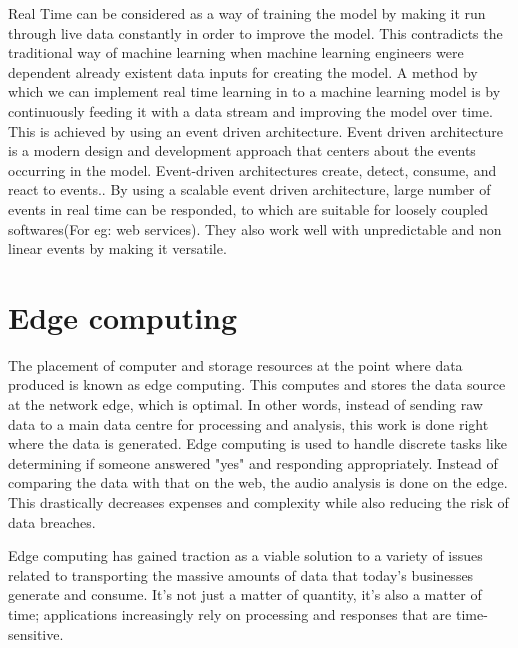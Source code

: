Real Time can be considered as a way of training the model by making it run through live data constantly in order to improve the model. This contradicts the traditional way of machine learning when machine learning engineers were dependent already existent data inputs for creating the model. 
A method by which we can implement real time learning in to a machine learning model is by continuously feeding it with a data stream and improving the model over time. This is achieved by using an event driven architecture. Event driven architecture is a modern design and development approach that centers about the events occurring in the model. Event-driven architectures create, detect, consume, and react to events.\cite{Hazelcast:2022}. By using a scalable event driven architecture, large number of events in real time can be responded, to which are suitable for loosely coupled softwares(For eg: web services). They also work well with unpredictable and non linear events by making it versatile. \cite{Hazelcast:2022}

\section{Edge computing}

The placement of computer and storage resources at the point where data produced is known as edge computing. This computes and stores  the data source at the network edge, which is optimal. In other words, instead of sending raw data to a main data centre for processing and analysis, this work is done right where the data is generated.
Edge computing is used to handle discrete tasks like determining if someone answered "yes" and responding appropriately. Instead of comparing the data with that on the web, the audio analysis is done on the edge. This drastically decreases expenses and complexity while also reducing the risk of data breaches.\cite{Bigelow:2021}

Edge computing has gained traction as a viable solution to a variety of issues related to transporting the massive amounts of data that today's businesses generate and consume. It's not just a matter of quantity, it's also a matter of time; applications increasingly rely on processing and responses that are time-sensitive.
